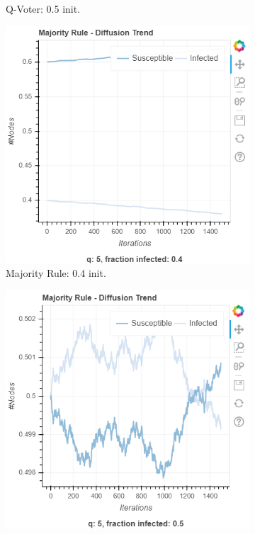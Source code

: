 \documentclass[sigchi]{acmart}
\begin{document}
\begin{figure}[ht]
\begin{subfigure}{.20\textwidth}
  \caption{Q-Voter: 0.5 init.}
  \label{fig:sub-fourth}
\end{subfigure}
\begin{subfigure}{.20\textwidth}
  \centering
  \includegraphics[width=\linewidth]{report/img/majority1.png}  
  \caption{Majority Rule: 0.4 init.}
  \label{fig:sub-fifth}
\end{subfigure}
\hfill
\begin{subfigure}{.20\textwidth}
  \centering
  \includegraphics[width=\linewidth]{report/img/majority2.png}  

\end{subfigure}
\end{figure}
\end{document}
